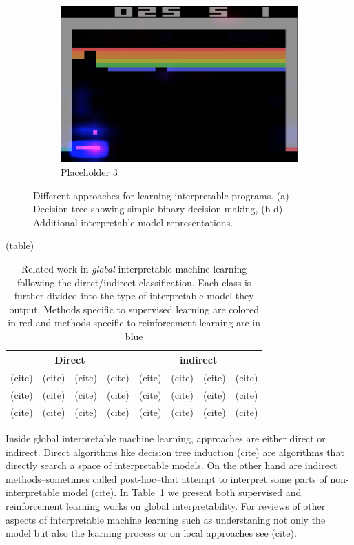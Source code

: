 \begin{figure}[htbp]
    \hfill
    \begin{subfigure}[b]{0.32\textwidth}
        \centering
        \includegraphics[width=\textwidth]{images/images_intro/breakout_reflect_bp.png}
        \caption{Placeholder 3}
        \label{fig:placeholder3}
    \end{subfigure}
    \caption{Different approaches for learning interpretable programs. (a) Decision tree showing simple binary decision making, (b-d) Additional interpretable model representations.}
    \label{fig:interpretable-approaches}
\end{figure}

(table)
\begin{table}[htbp]
    \centering
    \caption{Related work in \textit{global} interpretable machine learning following the direct/indirect classification. Each class is further divided into the type of interpretable model they output. Methods specific to supervised learning are colored in {\color{red} red} and methods specific to reinforcement learning are in {\color{blue} blue}}\label{tab:related-work}
    \begin{tabular}{|cccc|cccc|}
        \toprule
        \multicolumn{4}{|c|}{\textbf{Direct}} &
        \multicolumn{4}{|c|}{\textbf{indirect}} \\
        \midrule
        (cite) &(cite) &(cite) &(cite) &(cite) &(cite) &(cite) &(cite) \\
        (cite) &(cite) &(cite) &(cite) &(cite) &(cite) &(cite) &(cite) \\
        (cite) &(cite) &(cite) &(cite) &(cite) &(cite) &(cite) &(cite) \\
        \bottomrule
    \end{tabular}
\end{table}
Inside global interpretable machine learning, approaches are either direct or indirect. Direct algorithms like decision tree induction (cite) are algorithms that directly search a space of interpretable models. On the other hand are indirect methods--sometimes called post-hoc--that attempt to interpret some parts of non-interpretable model (cite).
In Table~\ref{tab:related-work} we present both supervised and reinforcement learning works on global interpretability. For reviews of other aspects of interpretable machine learning such as understaning not only the model but also the learning process or on local approaches see (cite). 


